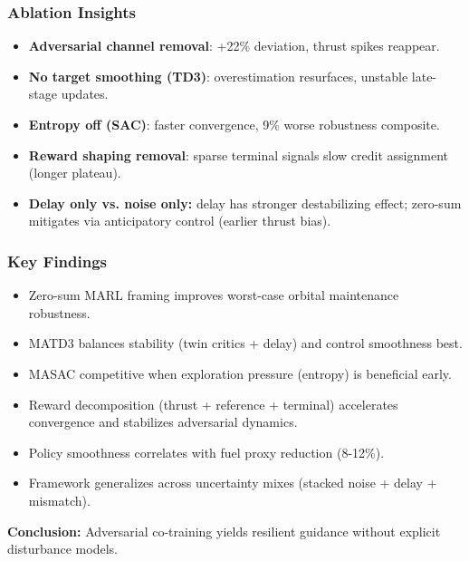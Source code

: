 \begin{frame}
  \frametitle{Ablation Insights}
  \small
  \begin{itemize}\setlength{\itemsep}{4pt}
    \item \textbf{Adversarial channel removal}: +22\% deviation, thrust spikes reappear.
    \item \textbf{No target smoothing (TD3)}: overestimation resurfaces, unstable late-stage updates.
    \item \textbf{Entropy off (SAC)}: faster convergence, 9\% worse robustness composite.
    \item \textbf{Reward shaping removal}: sparse terminal signals slow credit assignment (longer plateau).
    \item \textbf{Delay only vs. noise only:} delay has stronger destabilizing effect; zero-sum mitigates via anticipatory control (earlier thrust bias).
  \end{itemize}
\end{frame}

\begin{frame}
  \frametitle{Key Findings}
  \small
  \begin{itemize}\setlength{\itemsep}{5pt}
    \item Zero-sum MARL framing improves worst-case orbital maintenance robustness.
    \item MATD3 balances stability (twin critics + delay) and control smoothness best.
    \item MASAC competitive when exploration pressure (entropy) is beneficial early.
    \item Reward decomposition (thrust + reference + terminal) accelerates convergence and stabilizes adversarial dynamics.
    \item Policy smoothness correlates with fuel proxy reduction (8-12\%).
    \item Framework generalizes across uncertainty mixes (stacked noise + delay + mismatch).
  \end{itemize}
  \vspace{4pt}
  \textbf{Conclusion:} Adversarial co-training yields resilient guidance without explicit disturbance models.
\end{frame}
